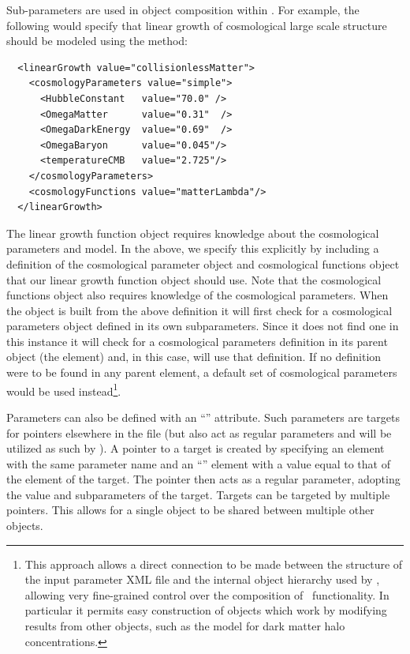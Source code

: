 Sub-parameters are used in object composition within \glc. For example, the following would specify that linear growth of cosmological large scale structure should be modeled using the  method:
\begin{verbatim}
  <linearGrowth value="collisionlessMatter">
    <cosmologyParameters value="simple">
      <HubbleConstant   value="70.0" />
      <OmegaMatter      value="0.31"  />
      <OmegaDarkEnergy  value="0.69"  />
      <OmegaBaryon      value="0.045"/>
      <temperatureCMB   value="2.725"/>
    </cosmologyParameters>
    <cosmologyFunctions value="matterLambda"/>
  </linearGrowth>
\end{verbatim}
The linear growth function object requires knowledge about the cosmological parameters and model. In the above, we specify this explicitly by including a definition of the cosmological parameter object and cosmological functions object that our linear growth function object should use. Note that the cosmological functions object also requires knowledge of the cosmological parameters. When the  object is built from the above definition it will first check for a cosmological parameters object defined in its own subparameters. Since it does not find one in this instance it will check for a cosmological parameters definition in its parent object (the  element) and, in this case, will use that definition. If no definition were to be found in any parent element, a default set of cosmological parameters would be used instead\footnote{This approach allows a direct connection to be made between the structure of the input parameter XML file and the internal object hierarchy used by \glc, allowing very fine-grained control over the composition of \glc\ functionality. In particular it permits easy construction of objects which work by modifying results from other objects, such as the \protect{} model for dark matter halo concentrations.}.

Parameters can also be defined with an ``'' attribute. Such parameters are targets for pointers elsewhere in the file (but also act as regular parameters and will be utilized as such by \glc). A pointer to a target is created by specifying an element with the same parameter name and an ``'' element with a value equal to that of the  element of the target. The pointer then acts as a regular parameter, adopting the value and subparameters of the target. Targets can be targeted by multiple pointers. This allows for a single object to be shared between multiple other objects.

